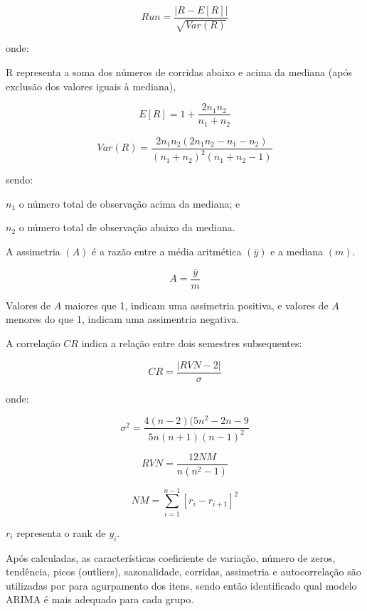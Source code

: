 \documentclass{book}
\begin{document}
\begin{equation}
Run = \frac{|R - E[R]|}{\sqrt{Var(R)}}
\end{equation}

onde: 

R representa a soma dos números de corridas abaixo e acima da mediana (após exclusão dos valores iguais à mediana),

\begin{equation}
E[R] = 1 + \frac{2n_1n_2}{n_1 + n_2}
\end{equation}

\begin{equation}
Var(R) = \frac{2n_1n_2(2n_1n_2 - n_1 - n_2)}{(n_1 + n_2)^2(n_1+n_2-1)}
\end{equation}

sendo:

$n_1$ o número total de observação acima da mediana; e

$n_2$ o número total de observação abaixo da mediana.

A assimetria $(A)$ é a razão entre a média aritmética $(\bar{y})$ e a mediana $(m)$.

\begin{equation}
A = \frac{\bar{y}}{m}
\end{equation}

Valores de $A$ maiores que 1, indicam uma assimetria positiva, e valores de $A$ menores do que 1, indicam uma assimentria negativa.

A correlação $CR$ indica a relação entre dois semestres subsequentes:

\begin{equation}
CR = \frac{|RVN-2|}{\sigma}
\end{equation}

onde:

\begin{equation}
\sigma^2 = \frac{4(n-2)(5n^2-2n-9}{5n(n+1)(n-1)^2}
\end{equation}

\begin{equation}
RVN = \frac{12NM}{n(n^2-1)}
\end{equation}

\begin{equation}
NM = \sum_{i=1}^{n-1}{[r_i-r_{i+1}]^2}
\end{equation}

$r_i$ representa o rank de $y_i$.

Após calculadas, as características coeficiente de variação, número de zeros, tendência, picos (outliers), sazonalidade, corridas, assimetria e autocorrelação são utilizadas por \cite{BusingerRead1999} para agurpamento dos itens, sendo então identificado qual modelo ARIMA é mais adequado para cada grupo. 
\end{document}
